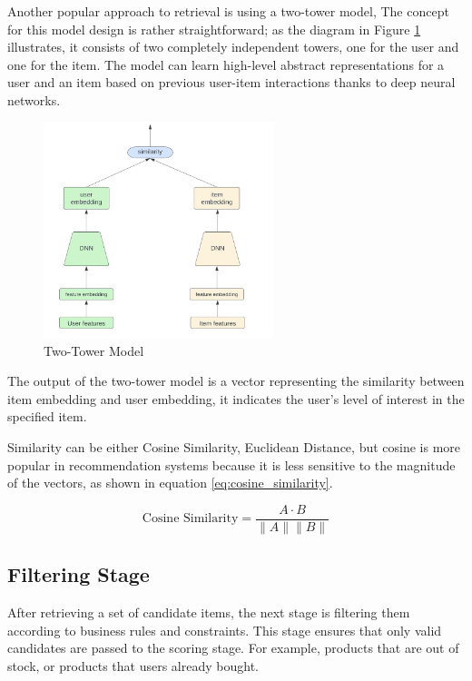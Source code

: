 Another popular approach to retrieval is using a two-tower model, 
The concept for this model design is rather straightforward; as the diagram in Figure \ref{fig:TwoTowerModel} illustrates, it consists of two completely independent towers, 
one for the user and one for the item. 
The model can learn high-level abstract representations for a user and an item 
based on previous user-item interactions thanks to deep neural networks. 

\begin{figure}[H]
    \centering
    \includegraphics[width=0.6\textwidth]{assets/two_tower.jpeg}
    \caption{Two-Tower Model\cite{TwoTowerInRecSys}}
    \label{fig:TwoTowerModel}
\end{figure}

The output of the two-tower model is a vector representing the similarity between item embedding and user embedding, 
it indicates the user's level of interest in the specified item.

Similarity can be either Cosine Similarity, Euclidean Distance, but cosine is more popular in recommendation systems because it is less sensitive to the magnitude of the vectors, as shown in equation \ref{eq:cosine_similarity}.

\begin{equation}
    \text{Cosine Similarity} = \frac{A \cdot B}{\|A\| \|B\|}
    \label{eq:cosine_similarity}
\end{equation}


\subsection{Filtering Stage}

After retrieving a set of candidate items, the next stage is filtering them according to business rules and constraints.
This stage ensures that only valid candidates are passed to the scoring stage.
For example, products that are out of stock, or products that users already bought.

